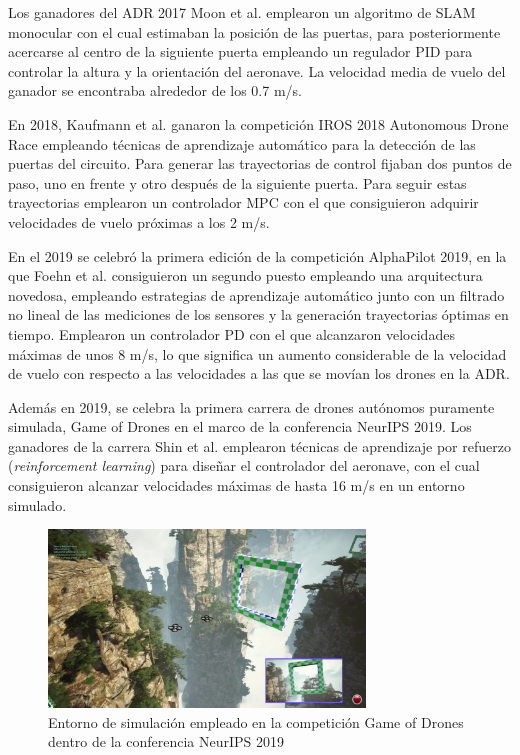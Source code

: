 Los ganadores del ADR 2017 Moon et al. \cite{moon2019challenges} emplearon un algoritmo de SLAM monocular con el cual estimaban la posición de las puertas, para posteriormente acercarse al centro de la siguiente puerta empleando un regulador PID para controlar la altura y la orientación del aeronave. La velocidad media de vuelo del ganador se encontraba alrededor de los 0.7 m/s. 

En 2018, Kaufmann et al. \cite{BeautyAndTheBeast} ganaron la competición IROS 2018 Autonomous Drone Race  empleando técnicas de aprendizaje automático para la detección de las puertas del circuito. Para generar las trayectorias de control fijaban dos puntos de paso, uno en frente y otro después de la siguiente puerta. Para seguir estas trayectorias emplearon un controlador MPC con el que consiguieron adquirir velocidades de vuelo próximas a los 2 m/s.

En el 2019 se celebró la primera edición de la competición AlphaPilot 2019, en la que Foehn et al. \cite{foehn2020alphapilot} consiguieron un segundo puesto empleando una arquitectura novedosa, empleando estrategias de aprendizaje automático junto con un filtrado no lineal de las mediciones de los sensores y la generación trayectorias óptimas en tiempo. Emplearon un controlador PD con el que alcanzaron velocidades máximas de unos 8 m/s, lo que significa un aumento considerable de la velocidad de vuelo con respecto a las velocidades a las que se movían los drones en la ADR.

Además en 2019, se celebra la primera carrera de drones autónomos puramente simulada, Game of Drones en el marco de la conferencia NeurIPS 2019. Los ganadores de la carrera Shin et al. \cite{shinreport} emplearon técnicas de aprendizaje por refuerzo  (\textit{reinforcement learning}) para diseñar el controlador del aeronave, con el cual consiguieron alcanzar velocidades máximas de hasta 16 m/s en un entorno simulado.

\begin{figure}[htb!]
	\centering
	\includegraphics[width=0.75\textwidth]{imagenes/gameofdrones}
	\caption{Entorno de simulación empleado en la competición Game of Drones dentro de la conferencia NeurIPS 2019}
	\label{estado:GoD}
\end{figure}









